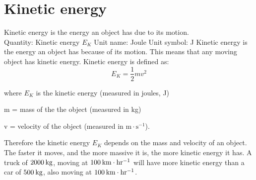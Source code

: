          \section{Kinetic energy}
    \nopagebreak
{} {Kinetic energy is the energy an object has due to its motion.\\
 Quantity: Kinetic energy {$E_{K}$} \hspace{2cm} Unit name: Joule \hspace{2cm} Unit symbol: J} 
      \label{m38785*id66796}Kinetic energy is the energy an object has because of its motion. This means that any moving object has kinetic energy. Kinetic energy is defined as:
    \begin{equation*}
    \boxed{{E}_{K}=\frac{1}{2}m{v}^{2}}
      \end{equation*}

where $E_{K}$ is the kinetic energy (measured in joules, J) \par
m = mass of the the object (measured in kg) \par
v = velocity of the object (measured in $\text{m} \cdot \text{s}^{-1}$). \par

Therefore the kinetic energy $E_{K}$ depends on the mass and velocity of an object. 
The faster it moves, and the more massive it is, the more kinetic energy it has. 
A truck of $2 000\phantom{\rule{2pt}{0ex}}\text{kg}$, moving at $100\phantom{\rule{2pt}{0ex}}\text{km}\ensuremath{\cdot}\text{hr}{}^{-1}$ will have more kinetic energy than a car of $500\phantom{\rule{2pt}{0ex}}\text{kg}$, also moving at $100\phantom{\rule{2pt}{0ex}}\text{km}\ensuremath{\cdot}\text{hr}{}^{-1}$. 
      \label{m38785*eip-368}
      \label{m38785*uid62}\nopagebreak\noindent{}

